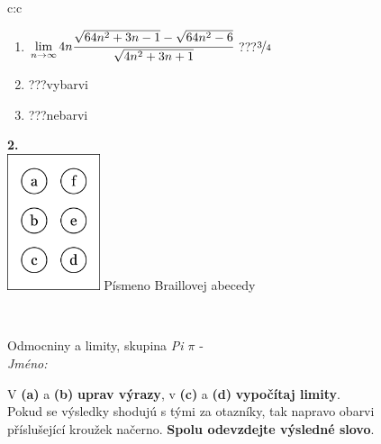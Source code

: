 \documentclass[10pt]{report}
\begin{document}
\begin{tabular}{c:c}
\begin{minipage}[c][104.5mm][t]{0.5\linewidth}
\begin{center}
\begin{minipage}{0.79\linewidth}
\begin{center}
\begin{varwidth}{\linewidth}
\begin{enumerate}
\item $\lim\limits_{n\to\infty}4n\cfrac{\sqrt{64n^2+3n-1}-\sqrt{64n^2-6}}{\sqrt{4n^2+3n+1}}$\quad \dotfill\; ???\;\dotfill \quad $\nicefrac{3}{4}$
\item \quad \dotfill\; ???\;\dotfill \quad vybarvi
\item \quad \dotfill\; ???\;\dotfill \quad nebarvi
\end{enumerate}
\end{varwidth}
\end{center}
\end{minipage}
\begin{minipage}{0.20\linewidth}
\begin{center}
{\Huge\bfseries 2.} \\[2mm]
\includegraphics[height=40mm]{../images/braille.png}
{\small Písmeno Braillovej abecedy}
\end{center}
\end{minipage}
\end{center}
\end{minipage}
\\ \hdashline
\begin{minipage}[c][104.5mm][t]{0.5\linewidth}
\begin{center}
\vspace{7mm}
{\huge Odmocniny a limity, skupina \textit{Pi $\pi$} -}\\[5mm]
\textit{Jméno:}\phantom{xxxxxxxxxxxxxxxxxxxxxxxxxxxxxxxxxxxxxxxxxxxxxxxxxxxxxxxxxxxxxxxxx}\\[5mm]
\begin{minipage}{0.95\linewidth}
\begin{center}
V \textbf{(a)} a \textbf{(b)} \textbf{uprav výrazy}, v \textbf{(c)} a \textbf{(d)} \textbf{vypočítaj limity}.\\Pokud se výsledky shodujú s tými za otazníky, tak napravo obarvi\\příslušející kroužek načerno. \textbf{Spolu odevzdejte výsledné slovo}.
\end{center}
\end{minipage}
\\[1mm]

\end{center}
\end{minipage}
\end{tabular}
\end{document}
